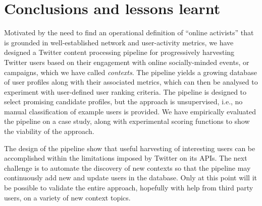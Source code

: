 \vspace{-10pt}
\section{Conclusions and lessons learnt}
\vspace{-10pt}


Motivated by the need to find an operational definition of ``online activists'' that is grounded in well-established network and user-activity metrics, we have designed a Twitter content processing pipeline for progressively harvesting Twitter users based on their engagement with online socially-minded events, or campaigns, which we have called \textit{contexts}.
The pipeline yields a growing database of user profiles along with their associated metrics, which can then be analysed to experiment with user-defined user ranking criteria. The pipeline is  designed to select promising candidate profiles, but the approach is unsupervised, i.e., no manual classification of example users is provided.
We have empirically evaluated the pipeline on a case study, along with experimental scoring functions to show the viability of the approach. 

The design of the pipeline show that useful harvesting of interesting users can be accomplished within the limitations imposed by Twitter on its APIs.
The next challenge is to automate the discovery of new contexts so that the pipeline may continuously add new and update users in the database.
Only at this point will it be possible to   validate the entire approach, hopefully with help from third party users, on a variety of new context topics.